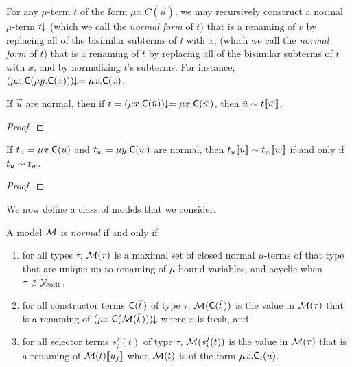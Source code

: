 For any $\mu$-term $t$ of the form $\mu x. C( \vec u )$, we may recursively construct a normal $\mu$-term ${t}\!\!\downarrow$
(which we call the \emph{normal form} of $t$)
that is a renaming of $v$ by replacing all of the bisimilar subterms of $t$ with $x$,
(which we call the \emph{normal form} of $t$)
that is a renaming of $t$ by replacing all of the bisimilar subterms of $t$ with $x$,
and by normalizing $t$'s subterms.
For instance, ${(\mu x. \textsf{C}( \mu y. \textsf{C}( x ) ))}\!\!\downarrow = \mu x. \textsf{C}( x )$.

\begin{lemma}
\label{lem:mu-norm-arg}
If $\vec u$ are normal, then if $t = {(\mu x. \textsf{C}( \bar u ) )}\!\!\downarrow = \mu x. \textsf{C}( \bar w )$,
then $\bar u \sim t[\![ \bar w ]\!]$.
\end{lemma}
\begin{proof}
\end{proof}

\begin{lemma}
\label{lem:mu-cong}
If $t_u = \mu x. \textsf{C}( \bar u )$ and $t_w = \mu y. \textsf{C}( \bar w )$ are normal,
then $t_u[\![  \bar u  ]\!] \sim t_w[\![  \bar w  ]\!]$ if and only if $t_u \sim t_w$.
\end{lemma}
\begin{proof}
\end{proof}

We now define a class of models that we consider.

\begin{definition} \label{def:norm-model}
A model $\mathcal{M}$ is \emph{normal} if and only if:
\begin{enumerate}
\item 
for all types $\tau$, 
$\mathcal{M}( \tau )$ is a maximal set of closed normal $\mu$-terms of that type that are 
unique up to renaming of $\mu$-bound variables,
and acyclic when $\tau \not\in \mathcal{Y}_{\mathrm{codt}}$,
\item 
for all constructor terms $\textsf{C}( \bar t \,)$ of type $\tau$,
$\mathcal{M}( \textsf{C}( \bar t \,) )$ is the value 
in $\mathcal{M}( \tau )$ that is a renaming of 
${(\mu x. \textsf{C}( \mathcal{M}( \bar t \,) ))}\!\!\downarrow$ where $x$ is fresh, and
\item 
for all selector terms $s^j_i( t )$ of type $\tau$,%
$\mathcal{M}( s^j_i( t ) )$ is the value
in $\mathcal{M}( \tau )$ that is a renaming of 
$\mathcal{M}( t )[\![ u_j ]\!]$
when $\mathcal{M}( t )$ is of the form $\mu x. \textsf{C}_i( \bar u )$.
\end{enumerate}
\end{definition}

